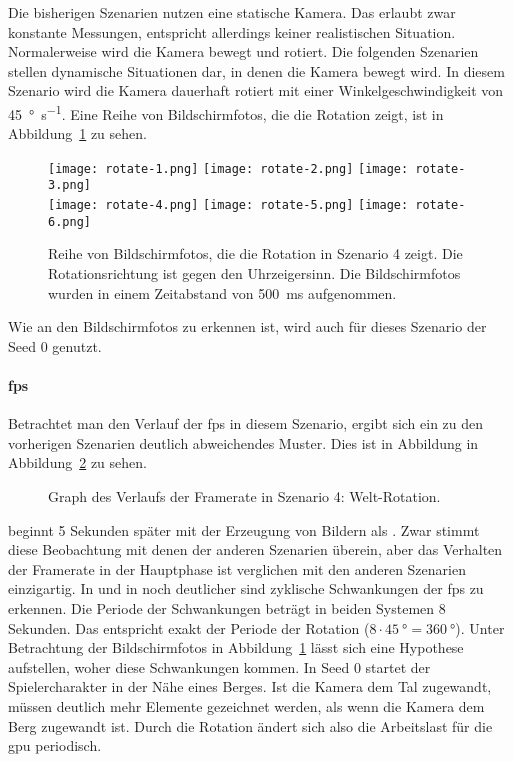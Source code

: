 Die bisherigen Szenarien nutzen eine statische Kamera. Das erlaubt zwar konstante Messungen, entspricht allerdings keiner realistischen Situation. Normalerweise wird die Kamera bewegt und rotiert. Die folgenden Szenarien stellen dynamische Situationen dar, in denen die Kamera bewegt wird. In diesem Szenario wird die Kamera dauerhaft rotiert mit einer Winkelgeschwindigkeit von \SI{45}{\degree\per\second}. Eine Reihe von Bildschirmfotos, die die Rotation zeigt, ist in Abbildung~\ref{fig:rotate} zu sehen.
\begin{figure}
	\centering
	\texttt{[image: rotate-1.png]}
	\texttt{[image: rotate-2.png]}
	\texttt{[image: rotate-3.png]}\\[4pt]
	\texttt{[image: rotate-4.png]}
	\texttt{[image: rotate-5.png]}
	\texttt{[image: rotate-6.png]}
	\caption{Reihe von Bildschirmfotos, die die Rotation in Szenario 4 zeigt. Die Rotationsrichtung ist gegen den Uhrzeigersinn. Die Bildschirmfotos wurden in einem Zeitabstand von \SI{500}{\milli\second} aufgenommen.}\label{fig:rotate}
\end{figure}
Wie an den Bildschirmfotos zu erkennen ist, wird auch für dieses Szenario der Seed 0 genutzt.

\paragraph{\ac{fps}}
Betrachtet man den Verlauf der \ac{fps} in diesem Szenario, ergibt sich ein zu den vorherigen Szenarien deutlich abweichendes Muster. Dies ist in Abbildung in Abbildung~\ref{fig:seed-0-rotate-fps} zu sehen.
\begin{figure}[!htbp]
	\caption{Graph des Verlaufs der Framerate in Szenario 4: Welt-Rotation.}\label{fig:seed-0-rotate-fps}
\end{figure}
\sysB{} beginnt 5 Sekunden später mit der Erzeugung von Bildern als \sysA{}. Zwar stimmt diese Beobachtung mit denen der anderen Szenarien überein, aber das Verhalten der Framerate in der Hauptphase ist verglichen mit den anderen Szenarien einzigartig. In \sysA{} und in \sysB{} noch deutlicher sind zyklische Schwankungen der \ac{fps} zu erkennen. Die Periode der Schwankungen beträgt in beiden Systemen 8 Sekunden. Das entspricht exakt der Periode der Rotation ($8\cdot \SI{45}{\degree} = \SI{360}{\degree}$). Unter Betrachtung der Bildschirmfotos in Abbildung~\ref{fig:rotate} lässt sich eine Hypothese aufstellen, woher diese Schwankungen kommen. In Seed 0 startet der Spielercharakter in der Nähe eines Berges. Ist die Kamera dem Tal zugewandt, müssen deutlich mehr Elemente gezeichnet werden, als wenn die Kamera dem Berg zugewandt ist. Durch die Rotation ändert sich also die Arbeitslast für die \ac{gpu} periodisch.

